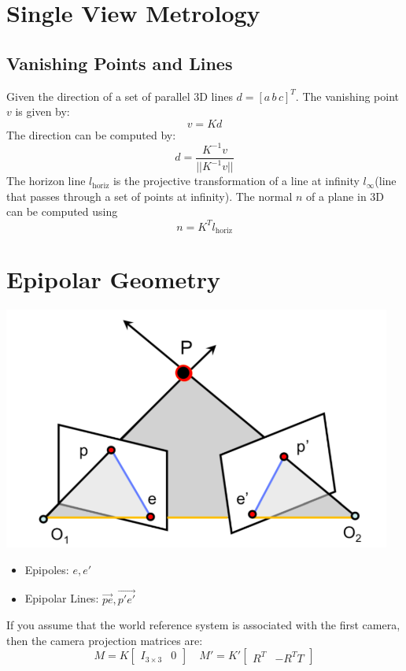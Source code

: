 \documentclass[8pt, a4paper, landscape, includeheadfoot]{extarticle}
\begin{document}
\begin{multicols*}{4}
	\section{Single View Metrology}
	\subsection{Vanishing Points and Lines}

	Given the direction of a set of parallel 3D lines $d = [a \, b \, c]^T$. The vanishing point $v$ is given by:
	$$
		v = Kd
	$$
	The direction can be computed by:
	$$
		d = \frac{K^{-1}v}{|| K^{-1}v ||}
	$$
	The horizon line $l_{\text{horiz}}$ is the projective transformation of a line at infinity $l_{\infty}$(line that passes through a set of points at infinity). The normal $n$ of a plane in 3D can be computed using
	$$
		n = K^T l_{\text{horiz}}
	$$

	\section{Epipolar Geometry}
	\begin{center}
		\includegraphics[width=\linewidth]{0_images/epipolar_geometry.png}
	\end{center}
	\begin{itemize}[itemsep=0pt, leftmargin=8pt]
		\item Epipoles: $e, e'$
		\item Epipolar Lines: $\vec{pe},  \vec{p'e'}$
	\end{itemize}
	If you assume that the world reference system is associated with the first camera, then the camera projection matrices are:
	$$
		M = K \begin{bmatrix}
			I_{3\times 3} & 0
		\end{bmatrix}  \quad M' = K' \begin{bmatrix}
			R^T & -R^T T
		\end{bmatrix}
	$$

\end{multicols*}
\end{document}
